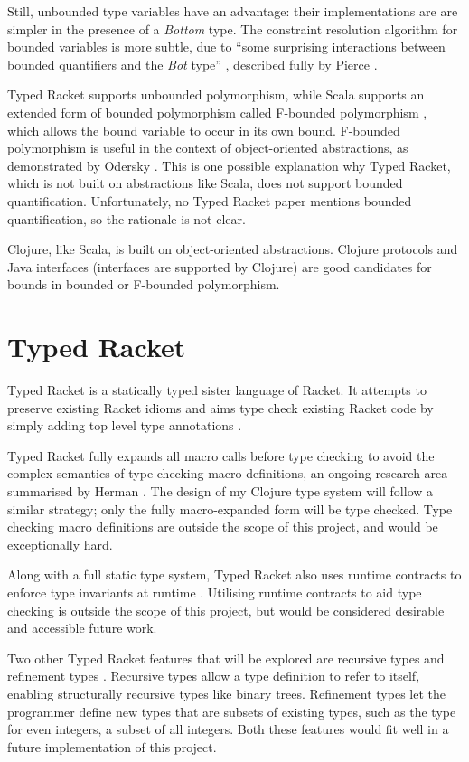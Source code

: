 Still, unbounded type variables have an advantage: their implementations are
are simpler in the presence of a \emph{Bottom} type. 
The constraint resolution algorithm for bounded variables
is more subtle, due to ``some surprising interactions between bounded quantifiers
and the \emph{Bot} type'' \cite{PT00}, described fully
by Pierce \cite{Pie97}.

Typed Racket \cite{TF08}
supports unbounded polymorphism, while Scala \cite{OCD+}
supports an extended form of bounded polymorphism called
F-bounded polymorphism \cite{CCHOM89}, which allows the
bound variable to occur in its own bound.
F-bounded polymorphism is useful in the context of object-oriented abstractions,
as demonstrated by Odersky \cite{OCD+}.
This is one possible explanation why Typed Racket, which is not built on abstractions like Scala,
does not support bounded quantification. Unfortunately, no Typed Racket paper mentions 
bounded quantification, so the rationale is not clear.

Clojure, like Scala, is built on object-oriented abstractions. Clojure protocols
and Java interfaces (interfaces are supported by Clojure) are good candidates
for bounds in bounded or F-bounded polymorphism.

\section{Typed Racket}

Typed Racket is a statically typed sister language of Racket. It
attempts to preserve existing Racket idioms and aims type check
existing Racket code by simply adding top level type annotations \cite{Tob10}.

Typed Racket fully expands all macro calls before type checking \cite{Tob10} to
avoid the complex semantics of type checking macro definitions, an ongoing research area summarised
 by Herman \cite{Her10}.
The design of my Clojure type system will follow a similar strategy; only the fully macro-expanded form
will be type checked. Type checking macro definitions are outside the scope of this project, and would
be exceptionally hard.

Along with a full static type system, Typed Racket 
also uses runtime contracts to enforce type invariants at runtime \cite{TF08}.
Utilising runtime contracts to aid type checking is outside the scope of this project, but would be 
considered desirable and accessible future work.

Two other Typed Racket features that will be explored are recursive types and refinement types  
\cite{Tob10}. Recursive types allow a type definition to refer to itself, enabling structurally
recursive types like binary trees. Refinement types let the programmer define
new types that are subsets of existing types, such as the type for even integers, a subset of all integers.
Both these features would fit well in a future implementation of this project.

